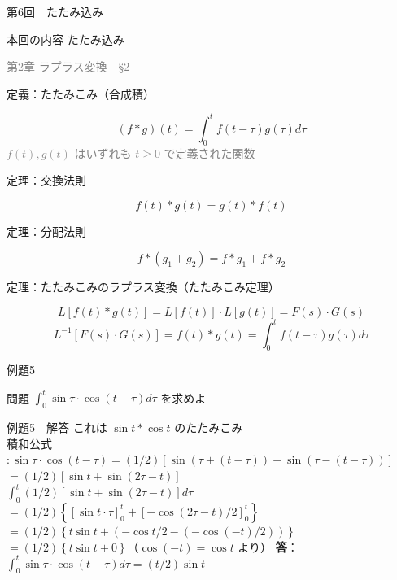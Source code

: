\documentclass[professionalfonts]{beamer}
\begin{document}
\begin{frame}{第6回　たたみ込み}
  \begin{block}{本回の内容}
  たたみ込み
  \end{block}
  \vfill\hfill{\scriptsize \textcolor{gray}{第2章 ラプラス変換　§2}}
\end{frame}

\begin{frame}{定義：たたみこみ（合成積）}
  \begin{block}{}
  \[
    (f * g)(t) = \int_{0}^t f(t-\tau)g(\tau) d\tau
  \]
  {\footnotesize \textcolor{gray}{$f(t), g(t)$ はいずれも $t \geq 0$ で定義された関数}}
  \end{block}
\end{frame}

\begin{frame}{定理：交換法則}
  \begin{block}{}
  \[
    f(t) * g(t) = g(t) * f(t)
  \]
  \end{block}
\end{frame}

\begin{frame}{定理：分配法則}
  \begin{block}{}
  \[
    f * (g_{1} + g_{2}) = f*g_{1} + f*g_{2}
  \]
  \end{block}
\end{frame}

\begin{frame}{定理：たたみこみのラプラス変換（たたみこみ定理）}
  \begin{block}{}
  \[
    L[f(t) * g(t)] = L[f(t)] \cdot L[g(t)] = F(s) \cdot G(s)
  \]
  \[
    L^{-1}[F(s) \cdot G(s)] = f(t) * g(t) = \int_{0}^t f(t-\tau)g(\tau) d\tau
  \]
  \end{block}
\end{frame}

\begin{frame}{例題5}
  \begin{exampleblock}{問題}
    $\int_{0}^t \sin \tau \cdot \cos(t-\tau) d\tau$ を求めよ\\[2pt]
  \end{exampleblock}
\end{frame}

\begin{frame}{例題5　解答}
  これは $\sin t * \cos t$ のたたみこみ\\[4pt]
  積和公式 $: \sin \tau\cdot \cos(t-\tau) = (1/2)[\sin(\tau+(t-\tau)) + \sin(\tau-(t-\tau))]$\\[4pt]
  $= (1/2)[\sin t + \sin(2\tau-t)]$\\[4pt]
  $\int_{0}^t (1/2)[\sin t + \sin(2\tau-t)]d\tau$\\[4pt]
  $= (1/2)\left\{ [\sin t \cdot \tau]_{0}^t + [-\cos(2\tau-t)/2]_{0}^t \right\}$\\[4pt]
  $= (1/2)\left\{ t\sin t + (-\cos t/2 - (-\cos(-t)/2)) \right\}$\\[4pt]
  $= (1/2)\left\{ t\sin t + 0 \right\}$（$\cos(-t) = \cos t$ より）
  \medskip\textbf{答}：$\int_{0}^t \sin \tau \cdot \cos(t-\tau) d\tau = (t/2) \sin t$
\end{frame}
\end{document}
